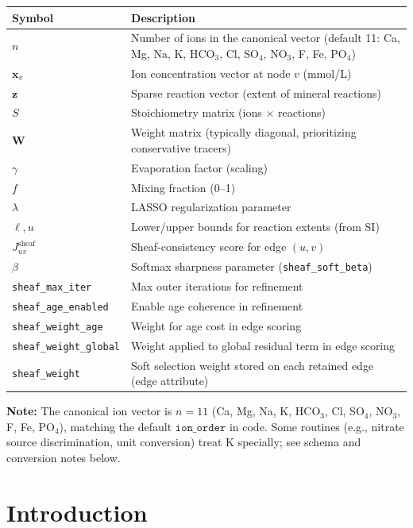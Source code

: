 \documentclass[12pt,a4paper]{article}
\theoremstyle{plain}
\theoremstyle{definition}
\theoremstyle{remark}
\begin{document}
{\small
\begin{longtable}{@{} p{} p{} @{} }
	\toprule
	\textbf{Symbol} & \textbf{Description} \\
\midrule
$n$ & Number of ions in the canonical vector (default 11: Ca, Mg, Na, K, HCO$_3$, Cl, SO$_4$, NO$_3$, F, Fe, PO$_4$) \\
$\mathbf{x}_v$ & Ion concentration vector at node $v$ (mmol/L) \\
$\mathbf{z}$ & Sparse reaction vector (extent of mineral reactions) \\
$S$ & Stoichiometry matrix (ions $\times$ reactions) \\
$\mathbf{W}$ & Weight matrix (typically diagonal, prioritizing conservative tracers) \\
$\gamma$ & Evaporation factor (scaling) \\
$f$ & Mixing fraction (0--1) \\
$\lambda$ & LASSO regularization parameter \\
$\ell, u$ & Lower/upper bounds for reaction extents (from SI) \\
$J^{\text{sheaf}}_{uv}$ & Sheaf-consistency score for edge $(u,v)$ \\
$\beta$ & Softmax sharpness parameter (\texttt{sheaf\_soft\_beta}) \\
\texttt{sheaf\_\allowbreak max\_\allowbreak iter} & Max outer iterations for refinement \\
\texttt{sheaf\_\allowbreak age\_\allowbreak enabled} & Enable age coherence in refinement \\
\texttt{sheaf\_\allowbreak weight\_\allowbreak age} & Weight for age cost in edge scoring \\
\texttt{sheaf\_\allowbreak weight\_\allowbreak global} & Weight applied to global residual term in edge scoring \\
\texttt{sheaf\_\allowbreak weight} & Soft selection weight stored on each retained edge (edge attribute) \\
\bottomrule
\end{longtable}
}
\textbf{Note:} The canonical ion vector is $n=11$ (Ca, Mg, Na, K, HCO$_3$, Cl, SO$_4$, NO$_3$, F, Fe, PO$_4$), matching the default $\texttt{ion\_order}$ in code. Some routines (e.g., nitrate source discrimination, unit conversion) treat K specially; see schema and conversion notes below.


\newpage

\section{Introduction}\label{sec:intro}
\end{document}
